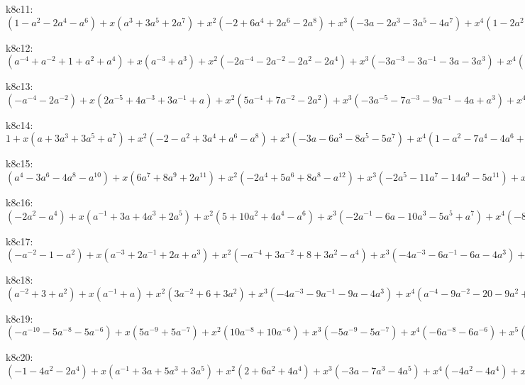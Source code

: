 k8c11: $ (1-a^{2}-2a^{4}-a^{6}) +x(a^{3}+3a^{5}+2a^{7}) +x^{2}(-2+6a^{4}+2a^{6}-2a^{8}) +x^{3}(-3a-2a^{3}-3a^{5}-4a^{7}) +x^{4}(1-2a^{2}-7a^{4}-3a^{6}+a^{8}) +x^{5}(2a+a^{3}+a^{5}+2a^{7}) +x^{6}(2a^{2}+4a^{4}+2a^{6}) +x^{7}(a^{3}+a^{5}) $

k8c12: $ (a^{-4}+a^{-2}+1+a^{2}+a^{4}) +x(a^{-3}+a^{3}) +x^{2}(-2a^{-4}-2a^{-2}-2a^{2}-2a^{4}) +x^{3}(-3a^{-3}-3a^{-1}-3a-3a^{3}) +x^{4}(a^{-4}-a^{-2}-4-a^{2}+a^{4}) +x^{5}(2a^{-3}+2a^{-1}+2a+2a^{3}) +x^{6}(2a^{-2}+4+2a^{2}) +x^{7}(a^{-1}+a) $

k8c13: $ (-a^{-4}-2a^{-2}) +x(2a^{-5}+4a^{-3}+3a^{-1}+a) +x^{2}(5a^{-4}+7a^{-2}-2a^{2}) +x^{3}(-3a^{-5}-7a^{-3}-9a^{-1}-4a+a^{3}) +x^{4}(-6a^{-4}-11a^{-2}-2+3a^{2}) +x^{5}(a^{-5}+a^{-3}+4a^{-1}+4a) +x^{6}(2a^{-4}+5a^{-2}+3) +x^{7}(a^{-3}+a^{-1}) $

k8c14: $ 1 +x(a+3a^{3}+3a^{5}+a^{7}) +x^{2}(-2-a^{2}+3a^{4}+a^{6}-a^{8}) +x^{3}(-3a-6a^{3}-8a^{5}-5a^{7}) +x^{4}(1-a^{2}-7a^{4}-4a^{6}+a^{8}) +x^{5}(2a+3a^{3}+4a^{5}+3a^{7}) +x^{6}(2a^{2}+5a^{4}+3a^{6}) +x^{7}(a^{3}+a^{5}) $

k8c15: $ (a^{4}-3a^{6}-4a^{8}-a^{10}) +x(6a^{7}+8a^{9}+2a^{11}) +x^{2}(-2a^{4}+5a^{6}+8a^{8}-a^{12}) +x^{3}(-2a^{5}-11a^{7}-14a^{9}-5a^{11}) +x^{4}(a^{4}-5a^{6}-10a^{8}-3a^{10}+a^{12}) +x^{5}(2a^{5}+5a^{7}+6a^{9}+3a^{11}) +x^{6}(3a^{6}+6a^{8}+3a^{10}) +x^{7}(a^{7}+a^{9}) $

k8c16: $ (-2a^{2}-a^{4}) +x(a^{-1}+3a+4a^{3}+2a^{5}) +x^{2}(5+10a^{2}+4a^{4}-a^{6}) +x^{3}(-2a^{-1}-6a-10a^{3}-5a^{5}+a^{7}) +x^{4}(-8-18a^{2}-7a^{4}+3a^{6}) +x^{5}(a^{-1}-a+3a^{3}+5a^{5}) +x^{6}(3+8a^{2}+5a^{4}) +x^{7}(2a+2a^{3}) $

k8c17: $ (-a^{-2}-1-a^{2}) +x(a^{-3}+2a^{-1}+2a+a^{3}) +x^{2}(-a^{-4}+3a^{-2}+8+3a^{2}-a^{4}) +x^{3}(-4a^{-3}-6a^{-1}-6a-4a^{3}) +x^{4}(a^{-4}-6a^{-2}-14-6a^{2}+a^{4}) +x^{5}(3a^{-3}+2a^{-1}+2a+3a^{3}) +x^{6}(4a^{-2}+8+4a^{2}) +x^{7}(2a^{-1}+2a) $

k8c18: $ (a^{-2}+3+a^{2}) +x(a^{-1}+a) +x^{2}(3a^{-2}+6+3a^{2}) +x^{3}(-4a^{-3}-9a^{-1}-9a-4a^{3}) +x^{4}(a^{-4}-9a^{-2}-20-9a^{2}+a^{4}) +x^{5}(4a^{-3}+3a^{-1}+3a+4a^{3}) +x^{6}(6a^{-2}+12+6a^{2}) +x^{7}(3a^{-1}+3a) $

k8c19: $ (-a^{-10}-5a^{-8}-5a^{-6}) +x(5a^{-9}+5a^{-7}) +x^{2}(10a^{-8}+10a^{-6}) +x^{3}(-5a^{-9}-5a^{-7}) +x^{4}(-6a^{-8}-6a^{-6}) +x^{5}(a^{-9}+a^{-7}) +x^{6}(a^{-8}+a^{-6}) $

k8c20: $ (-1-4a^{2}-2a^{4}) +x(a^{-1}+3a+5a^{3}+3a^{5}) +x^{2}(2+6a^{2}+4a^{4}) +x^{3}(-3a-7a^{3}-4a^{5}) +x^{4}(-4a^{2}-4a^{4}) +x^{5}(a+2a^{3}+a^{5}) +x^{6}(a^{2}+a^{4}) $

